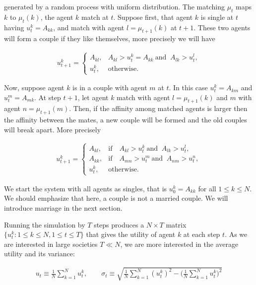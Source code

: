 \documentclass[12pt]{article}
\begin{document}
\noindent generated by a random process with uniform distribution. The matching $\mu_t$ maps $k$ to $\mu_t(k)$, the agent $k$ match at $t$. Suppose first, that agent $k$ is single at $t$ having $u_t^k=A_{kk}$, and match with agent $l=\mu_{t+1}(k)$ at $t+1$. These two agents will form a couple if they like themselves, more precisely we will have

\begin{align}
    u_{t+1}^k=\begin{cases} A_{kl}, & A_{kl}>u_t^k=A_{kk}\ \textrm{and }\ A_{lk}>u_{t}^l,\\
    u_t^k, & \textrm{otherwise}.
    \end{cases}
    \label{singleevolution}
\end{align}

\noindent Now, suppose agent $k$ is in a couple with agent $m$ at $t$. In this case $u_t^k=A_{km}$ and $u_t^m=A_{mk}$. At step $t+1$, let agent $k$ match with agent $l=\mu_{t+1}(k)$ and $m$ with agent $n=\mu_{t+1}(m)$. Then, if the affinity among matched agents is larger then the affinity between the mates, a new couple will be formed and the old couples will break apart. More precisely

\begin{align}
    u_{t+1}^k=\begin{cases} A_{kl}, & \textrm{if}\quad A_{kl}>u_t^k\ \textrm{and }\ A_{lk}>u_{t}^l,\\
    A_{kk}, & \textrm{if}\quad A_{mn}>u_t^m\ \textrm{and }\ A_{nm}>u_t^n,\\
    u_t^k, & \textrm{otherwise}.
    \end{cases}
    \label{coupleevolution}
\end{align}

\noindent We start the system with all agents as singles, that is $u_0^k=A_{kk}$ for all $1\leq k\leq N$. We should emphasize that here, a couple is not a married couple. We will introduce marriage in the next section.

Running the simulation by $T$ steps produces a $N\times T$ matrix $\{u_t^k:1\leq k\leq N,1\leq t\leq T\}$ that gives the utility of agent $k$ at each step $t$. As we are interested in large societies $T\ll N$, we are more interested in the average utility and its variance:

\begin{align}
    u_t\equiv\frac{1}{N}\sum_{k=1}^Nu_t^k,\qquad \sigma_t\equiv\sqrt{\frac{1}{N}\sum_{k=1}^N(u_t^k)^2-\Big(\frac{1}{N}\sum_{k=1}^Nu_t^k\Big)^2}
\end{align}
\end{document}
